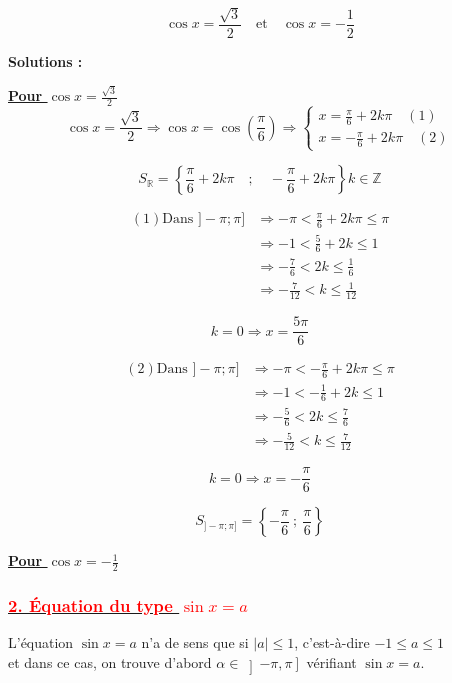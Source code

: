 \documentclass[a4paper,12pt]{article}
\begin{document}
\[
\cos x = \frac{\sqrt{3}}{2} \quad \text{et} \quad \cos x = -\frac{1}{2}
\]

\textbf{Solutions :}

\textbf{\underline{Pour $\cos x = \frac{\sqrt{3}}{2}$}}
\[
\cos x = \frac{\sqrt{3}}{2} \Rightarrow \cos x = \cos\left(\frac{\pi}{6}\right)
\Rightarrow 
\begin{cases}
x = \frac{\pi}{6} + 2k\pi \quad(1)\\
x = -\frac{\pi}{6} + 2k\pi \quad(2)
\end{cases}
\]

\[ S_{\mathbb{R}} = 
\left\{ \frac{\pi}{6} + 2k\pi \quad;\quad -\frac{\pi}{6} + 2k\pi \right\} k\in \mathbb{Z} \]

\[
\begin{aligned}
(1)\text{Dans } ]-\pi; \pi]&\Rightarrow-\pi < \frac{\pi}{6} + 2k\pi \leq \pi\\
&\Rightarrow -1 < \frac{5}{6} + 2k \leq 1\\
&\Rightarrow -\frac{7}{6} < 2k \leq \frac{1}{6}\\
&\Rightarrow -\frac{7}{12} < k \leq \frac{1}{12}
\end{aligned}
\]

\[
k = 0 \Rightarrow x = \frac{5\pi}{6}
\]

\[
\begin{aligned}
(2)\text{Dans } ]-\pi; \pi]&\Rightarrow-\pi < -\frac{\pi}{6} + 2k\pi \leq \pi\\
&\Rightarrow -1 < -\frac{1}{6} + 2k \leq 1\\
&\Rightarrow -\frac{5}{6} < 2k \leq \frac{7}{6}\\
&\Rightarrow -\frac{5}{12} < k \leq \frac{7}{12}
\end{aligned}
\]

\[
k = 0 \Rightarrow x = -\frac{\pi}{6}
\]

\[
\boxed{S_{]-\pi;\pi]} = \left\{ -\frac{\pi}{6} \ ;\ \frac{\pi}{6} \right\}}
\]

\textbf{\underline{Pour $\cos x = -\frac{1}{2}$}}

\subsubsection*{\underline{\textcolor{red}{2. Équation du type $\sin x = a$}}}

L'équation $\sin x = a$ n'a de sens que si $\lvert a \rvert \leq 1$, c'est-à-dire $-1 \leq a \leq 1$ \\
et dans ce cas, on trouve d'abord \( \alpha \in \left]-\pi, \pi\right] \) vérifiant \( \sin x = a \).\\
\end{document}

